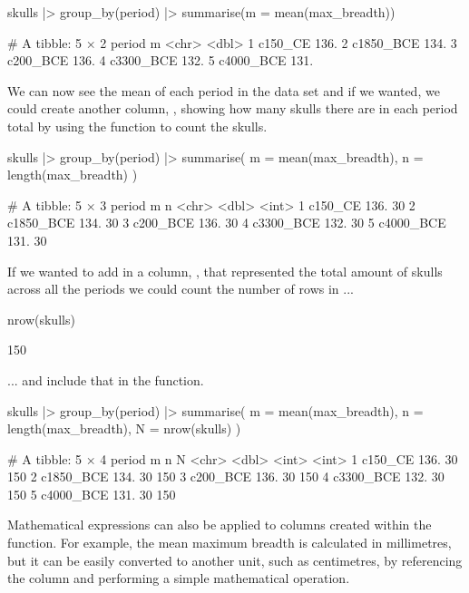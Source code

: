 \begin{inR}
skulls |> 
  group_by(period) |> 
  summarise(m = mean(max_breadth))
\end{inR}
\begin{outR}
# A tibble: 5 × 2
  period        m
  <chr>     <dbl>
1 c150_CE    136.
2 c1850_BCE  134.
3 c200_BCE   136.
4 c3300_BCE  132.
5 c4000_BCE  131.
\end{outR}

We can now see the mean of each period in the data set and if we wanted, we could create another column, , showing how many skulls there are in each period total by using the  function to count the skulls.

\begin{inR}
skulls |> 
  group_by(period) |> 
  summarise(
    m = mean(max_breadth),
    n = length(max_breadth)
    )
\end{inR}
\begin{outR}
# A tibble: 5 × 3
  period        m     n
  <chr>     <dbl> <int>
1 c150_CE    136.    30
2 c1850_BCE  134.    30
3 c200_BCE   136.    30
4 c3300_BCE  132.    30
5 c4000_BCE  131.    30
\end{outR}

If we wanted to add in a column, , that represented the total amount of skulls across all the periods we could count the number of rows in ...

\begin{inR}
nrow(skulls)
\end{inR}
\begin{outR}
[1] 150
\end{outR}

\noindent
... and include that in the  function.

\begin{inR}
skulls |> 
  group_by(period) |> 
  summarise(
    m = mean(max_breadth),
    n = length(max_breadth),
    N = nrow(skulls)
    )
\end{inR}
\begin{outR}
# A tibble: 5 × 4
  period        m     n     N
  <chr>     <dbl> <int> <int>
1 c150_CE    136.    30   150
2 c1850_BCE  134.    30   150
3 c200_BCE   136.    30   150
4 c3300_BCE  132.    30   150
5 c4000_BCE  131.    30   150
\end{outR}

Mathematical expressions can also be applied to columns created within the  function. For example, the mean maximum breadth is calculated in millimetres, but it can be easily converted to another unit, such as centimetres, by referencing the column and performing a simple mathematical operation.

